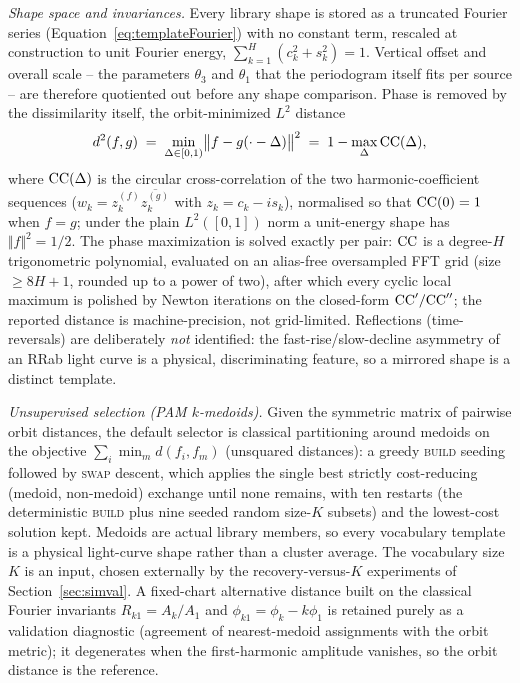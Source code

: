 \documentclass[apj]{emulateapj}
\begin{document}
\emph{Shape space and invariances.}
Every library shape is stored as a truncated Fourier series
(Equation~\ref{eq:templateFourier}) with no constant term, rescaled at
construction to unit Fourier energy, $\sum_{k=1}^{H}(c_k^2+s_k^2)=1$.
Vertical offset and overall scale -- the parameters $\theta_3$ and
$\theta_1$ that the periodogram itself fits per source -- are therefore
quotiented out before any shape comparison.  Phase is removed by the
dissimilarity itself, the orbit-minimized $L^2$ distance
\begin{equation}\label{eq:orbitdist}
    d^2(f, g) \;=\; \min_{\Delta\in[0,1)}
    \bigl\Vert f - g(\cdot - \Delta)\bigr\Vert^2
    \;=\; 1 - \max_{\Delta} {\rm CC}(\Delta),
\end{equation}
where ${\rm CC}(\Delta)$ is the circular cross-correlation of the two
harmonic-coefficient sequences ($w_k = z^{(f)}_k \overline{z^{(g)}_k}$
with $z_k = c_k - i s_k$), normalised so that ${\rm CC}(0) = 1$ when
$f = g$; under the plain $L^2([0,1])$ norm a unit-energy shape has
$\Vert f \Vert^2 = 1/2$.  The phase maximization is solved exactly
per pair: ${\rm CC}$ is a degree-$H$ trigonometric polynomial, evaluated
on an alias-free oversampled FFT grid (size $\geq 8H+1$, rounded up to a
power of two), after which every cyclic local maximum is polished by
Newton iterations on the closed-form ${\rm CC}'/{\rm CC}''$; the reported
distance is machine-precision, not grid-limited.  Reflections
(time-reversals) are deliberately \emph{not} identified: the
fast-rise/slow-decline asymmetry of an RRab light curve is a physical,
discriminating feature, so a mirrored shape is a distinct template.

\emph{Unsupervised selection (PAM $k$-medoids).}
Given the symmetric matrix of pairwise orbit distances, the default
selector is classical partitioning around medoids
\citep{Kaufman+Rousseeuw_1990} on the objective
$\sum_i \min_{m} d(f_i, f_m)$ (unsquared distances): a greedy
\textsc{build} seeding followed by \textsc{swap} descent, which applies
the single best strictly cost-reducing (medoid, non-medoid) exchange
until none remains, with ten restarts (the deterministic \textsc{build}
plus nine seeded random size-$K$ subsets) and the lowest-cost solution
kept.  Medoids are actual library members, so every vocabulary template
is a physical light-curve shape rather than a cluster average.  The
vocabulary size $K$ is an input, chosen externally by the
recovery-versus-$K$ experiments of Section~\ref{sec:simval}.  A
fixed-chart alternative distance built on the classical Fourier
invariants $R_{k1} = A_k/A_1$ and $\phi_{k1} = \phi_k - k\phi_1$
\citep{Simon+Lee_1981} is retained purely as a validation diagnostic
(agreement of nearest-medoid assignments with the orbit metric); it
degenerates when the first-harmonic amplitude vanishes, so the orbit
distance is the reference.
\end{document}
